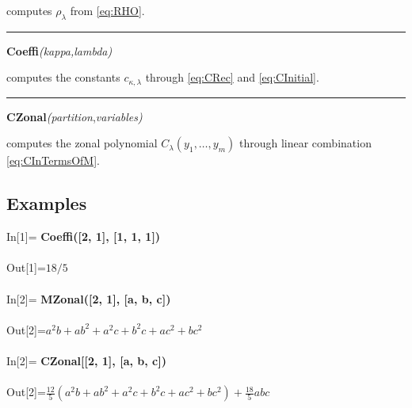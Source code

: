 \documentclass[10pt,oneside,american]{amsart}
\numberwithin{equation}{section}
\numberwithin{figure}{section}
\theoremstyle{definition}
\theoremstyle{remark}
\theoremstyle{plain}
\theoremstyle{definition}
\theoremstyle{plain}
\theoremstyle{plain}
\theoremstyle{plain}
\begin{document}
\noindent \begin{flushleft}
computes $\rho_{\lambda}$ from \eqref{eq:RHO}.
\par\end{flushleft}

\noindent \begin{flushleft}
\rule[0.5ex]{1\columnwidth}{1pt}
\par\end{flushleft}

\noindent \begin{flushleft}
\textbf{Coeffi}\emph{(kappa,lambda)}
\par\end{flushleft}

\noindent \begin{flushleft}
computes the constants $c_{\kappa,\lambda}$ through \eqref{eq:CRec}
and \eqref{eq:CInitial}.
\par\end{flushleft}

\noindent \begin{flushleft}
\rule[0.5ex]{1\columnwidth}{1pt}
\par\end{flushleft}

\noindent \begin{flushleft}
\textbf{CZonal}\emph{(partition},\emph{variables)}
\par\end{flushleft}

\noindent \begin{flushleft}
computes the zonal polynomial $C_{\lambda}\left(y_{1},\ldots,y_{m}\right)$
through linear combination \eqref{eq:CInTermsOfM}.
\par\end{flushleft}

\subsection{Examples}
\noindent \begin{flushleft}
In{[}1{]}= \textbf{Coeffi({[}2, 1{]}, {[}1, 1, 1{]})}\\
~\\
Out{[}1{]}=$18/5$\\
~\\
In{[}2{]}= \textbf{MZonal({[}2, 1{]}, {[}a, b, c{]})}\\
~\\
Out{[}2{]}=$a^{2}b+ab^{2}+a^{2}c+b^{2}c+ac^{2}+bc^{2}$\\
~\\
In{[}2{]}= \textbf{CZonal{[}{[}2, 1{]}, {[}a, b, c{]})}\\
~\\
Out{[}2{]}=$\frac{12}{5}\left(a^{2}b+ab^{2}+a^{2}c+b^{2}c+ac^{2}+bc^{2}\right)+\frac{18}{5}abc$
\par\end{flushleft}
\end{document}

